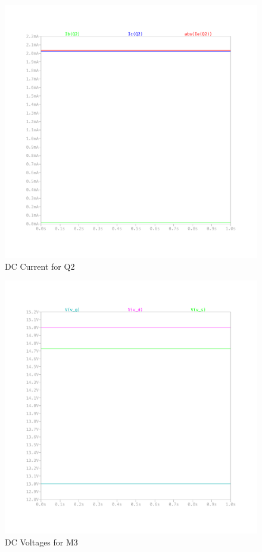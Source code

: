 \documentclass{article}
\begin{document}
\begin{figure}[H]
    \centering
    \includegraphics[height=0.4\textheight,trim={30mm 30mm 30mm 30mm}]{img/Amplifier Design Q2 I.pdf}
    \caption{DC Current for Q2}
    \label{fig:dc-i-q2}
\end{figure}

\begin{figure}[H]
    \centering
    \includegraphics[height=0.4\textheight,trim={30mm 30mm 30mm 30mm}]{img/Amplifier Design M3 V.pdf}
    \caption{DC Voltages for M3}
    \label{fig:dc-v-m3}
\end{figure}
\end{document}
